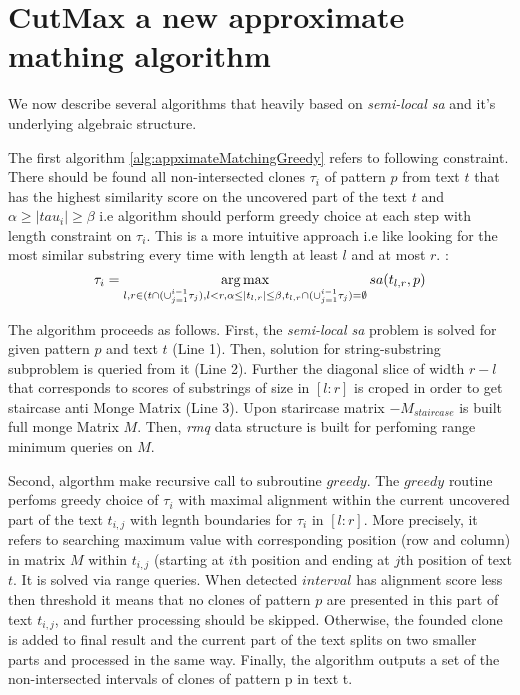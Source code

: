 \section{CutMax a new approximate mathing algorithm}
\label{section:our}
We now describe several algorithms that heavily based on \emph{semi-local sa} and it's underlying algebraic structure.

The first algorithm \ref{alg:appximateMatchingGreedy} refers to following constraint.
There should be found all non-intersected clones $\tau_{i}$ of pattern $p$ from text $t$ that has the highest similarity score on the uncovered part of the text $t$ and $\alpha \geq |tau_{i}| \geq \beta$  i.e algorithm should perform greedy choice at each step with length constraint on $\tau_{i}$.
This is a more intuitive approach i.e like looking for the most similar substring every time with length at least $l$ and at most $r$. 
:
\begin{equation}
   \tau_{i} =  \operatorname*{arg\,max}_{l,r \in (t \cap (\cup_{j=1}^{i-1} \tau_{j}),l<r, \alpha \leq |t_{l,r}| \leq \beta ,t_{l,r} \cap (\cup_{j=1}^{i-1} \tau_{j}) = \emptyset } sa(t_{l,r}, p)
\end{equation}

The algorithm proceeds as follows.
First, the \emph{semi-local sa} problem is solved for given pattern $p$ and text $t$ (Line 1).
Then, solution for string-substring subproblem is queried from it (Line 2).
Further the diagonal slice of width $r-l$ that corresponds to
scores of substrings of size in $[l:r]$ is croped in order to get staircase anti Monge Matrix (Line 3).
Upon starircase matrix $-M_{staircase}$ is built full monge Matrix $M$. 
Then, \emph{rmq} data structure is built  for perfoming range minimum queries on $M$.

Second, algorthm make recursive call to subroutine $greedy$.
The $greedy$ routine perfoms greedy choice of $\tau_{i}$  with maximal alignment within the current uncovered part of the text $t_{i,j}$ with legnth boundaries for $\tau_{i}$ in $[l:r]$.
More precisely, it refers to searching maximum value with corresponding position (row and column) in matrix $M$ within  $t_{i,j}$ (starting at $i$th position and ending at $j$th position of text $t$.
It is solved via range queries.
When detected $interval$ has alignment score less then threshold it means that no clones of pattern $p$ are presented in this part of text $t_{i,j}$, and further processing should be skipped.
Otherwise, the founded clone is added to final result and the current part of the text splits on two smaller parts and processed in the same way.
Finally, the algorithm outputs a set of the non-intersected intervals of clones of pattern p in text t.


